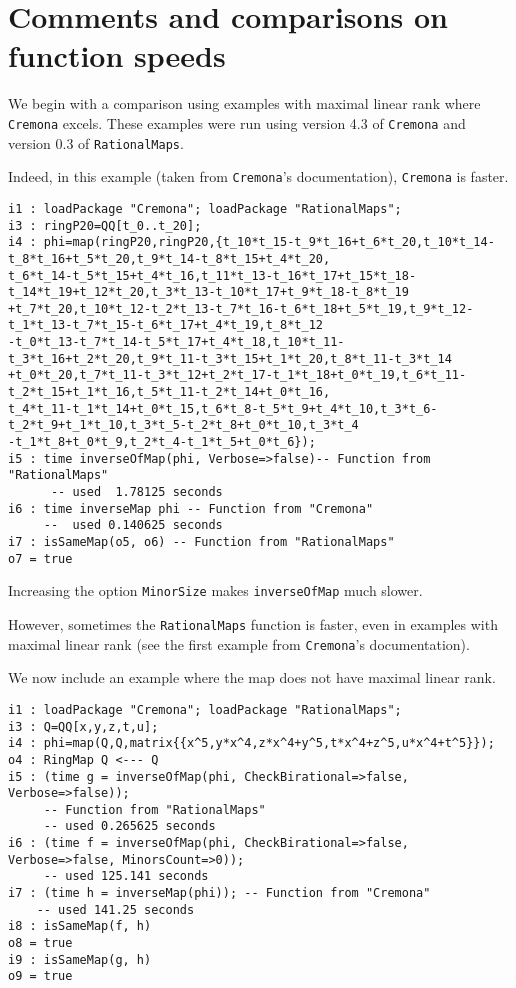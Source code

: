 \documentclass[11pt]{amsart}
\numberwithin{equation}{theorem}
\renewcommand{\:}{\colon}
\theoremstyle{theorem}
\begin{document}
{\section{Comments and comparisons on function speeds}
\noindent
We begin with a comparison using examples with maximal linear rank where {\tt Cremona} excels.  These examples were run using version 4.3 of {\tt Cremona} and version 0.3 of {\tt RationalMaps}.

Indeed, in this example (taken from {\tt Cremona}'s documentation), {\tt Cremona} is faster.
{\scriptsize
\color{blue}\begin{verbatim}
i1 : loadPackage "Cremona"; loadPackage "RationalMaps";
i3 : ringP20=QQ[t_0..t_20];
i4 : phi=map(ringP20,ringP20,{t_10*t_15-t_9*t_16+t_6*t_20,t_10*t_14-t_8*t_16+t_5*t_20,t_9*t_14-t_8*t_15+t_4*t_20,
t_6*t_14-t_5*t_15+t_4*t_16,t_11*t_13-t_16*t_17+t_15*t_18-t_14*t_19+t_12*t_20,t_3*t_13-t_10*t_17+t_9*t_18-t_8*t_19
+t_7*t_20,t_10*t_12-t_2*t_13-t_7*t_16-t_6*t_18+t_5*t_19,t_9*t_12-t_1*t_13-t_7*t_15-t_6*t_17+t_4*t_19,t_8*t_12
-t_0*t_13-t_7*t_14-t_5*t_17+t_4*t_18,t_10*t_11-t_3*t_16+t_2*t_20,t_9*t_11-t_3*t_15+t_1*t_20,t_8*t_11-t_3*t_14
+t_0*t_20,t_7*t_11-t_3*t_12+t_2*t_17-t_1*t_18+t_0*t_19,t_6*t_11-t_2*t_15+t_1*t_16,t_5*t_11-t_2*t_14+t_0*t_16,
t_4*t_11-t_1*t_14+t_0*t_15,t_6*t_8-t_5*t_9+t_4*t_10,t_3*t_6-t_2*t_9+t_1*t_10,t_3*t_5-t_2*t_8+t_0*t_10,t_3*t_4
-t_1*t_8+t_0*t_9,t_2*t_4-t_1*t_5+t_0*t_6});
i5 : time inverseOfMap(phi, Verbose=>false)-- Function from "RationalMaps"
      -- used  1.78125 seconds
i6 : time inverseMap phi -- Function from "Cremona"
     --  used 0.140625 seconds
i7 : isSameMap(o5, o6) -- Function from "RationalMaps"
o7 = true
\end{verbatim}
}
{\color{black}\normalsize}
Increasing the option {\tt MinorSize} makes {\tt inverseOfMap} much slower.

However, sometimes the {\tt RationalMaps} function is faster, even in examples with maximal linear rank (see the first example from {\tt Cremona}'s documentation).
}
{\color{black}\normalsize
We now include an example where the map does not have maximal linear rank.  %
}
{\scriptsize
\color{blue}\begin{verbatim}
i1 : loadPackage "Cremona"; loadPackage "RationalMaps";
i3 : Q=QQ[x,y,z,t,u];
i4 : phi=map(Q,Q,matrix{{x^5,y*x^4,z*x^4+y^5,t*x^4+z^5,u*x^4+t^5}});
o4 : RingMap Q <--- Q
i5 : (time g = inverseOfMap(phi, CheckBirational=>false, Verbose=>false));
     -- Function from "RationalMaps"
     -- used 0.265625 seconds
i6 : (time f = inverseOfMap(phi, CheckBirational=>false, Verbose=>false, MinorsCount=>0));
     -- used 125.141 seconds
i7 : (time h = inverseMap(phi)); -- Function from "Cremona"
    -- used 141.25 seconds
i8 : isSameMap(f, h)
o8 = true
i9 : isSameMap(g, h)
o9 = true
\end{verbatim}
}
\end{document}

